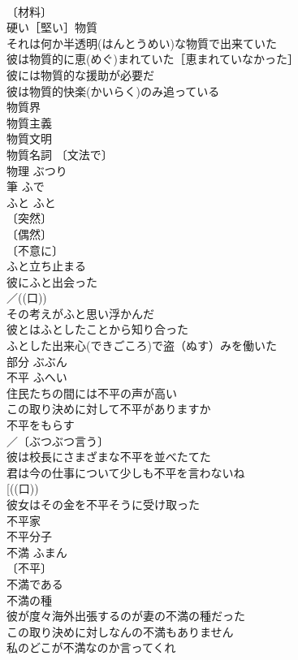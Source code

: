 \documentclass[8pt]{extreport}
\begin{document}
\begin{CJK}{UTF8}{min}
\\	〔材料〕
\\	硬い［堅い］物質 
\\	それは何か半透明(はんとうめい)な物質で出来ていた 
\\	彼は物質的に恵(めぐ)まれていた［恵まれていなかった］ 
\\	彼には物質的な援助が必要だ 
\\	彼は物質的快楽(かいらく)のみ追っている 
\\	物質界 
\\	物質主義 
\\	物質文明 
\\	物質名詞 〔文法で〕
\\	物理	ぶつり	
\\	筆	ふで	
\\	ふと	ふと	
\\	〔突然〕
\\	〔偶然〕
\\	〔不意に〕
\\	ふと立ち止まる 
\\	彼にふと出会った 
\\	／((口)) 
\\	その考えがふと思い浮かんだ 
\\	彼とはふとしたことから知り合った 
\\	ふとした出来心(できごころ)で盗（ぬす）みを働いた 
\\	部分	ぶぶん	
\\	不平	ふへい	
\\	住民たちの間には不平の声が高い 
\\	この取り決めに対して不平がありますか 
\\	不平をもらす 
\\	／〔ぶつぶつ言う〕
\\	彼は校長にさまざまな不平を並べたてた 
\\	君は今の仕事について少しも不平を言わないね 
\\	[((口))
\\	彼女はその金を不平そうに受け取った 
\\	不平家 
\\	不平分子 
\\	不満	ふまん	
\\	〔不平〕
\\	不満である 
\\	不満の種 
\\	彼が度々海外出張するのが妻の不満の種だった 
\\	この取り決めに対しなんの不満もありません 
\\	私のどこが不満なのか言ってくれ 

\end{CJK}
\end{document}

